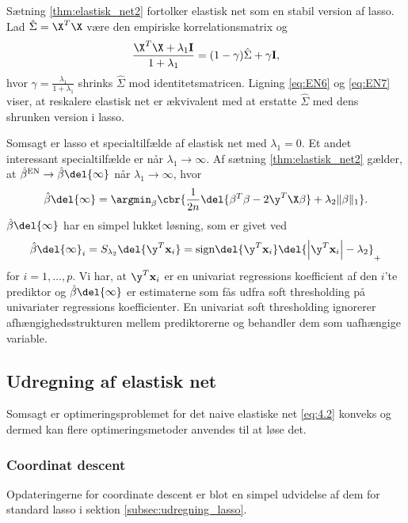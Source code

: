 %
Sætning \ref{thm:elastisk_net2} fortolker elastisk net som en stabil version af lasso.
Lad \(\hat{\Sigma} = \X^T \X\) være den empiriske korrelationsmatrix og
\begin{align*}
\frac{\X^T \X + \lambda_1 \mathbf{I}}{1 + \lambda_1} = (1-\gamma) \hat{\Sigma} + \gamma \mathbf{I},
\end{align*}
hvor \(\gamma=\frac{\lambda_1}{1+\lambda_1}\) shrinks \(\hat{\Sigma}\) mod identitetsmatricen.
Ligning \eqref{eq:EN6} og \eqref{eq:EN7} viser, at reskalere elastisk net er ækvivalent med at erstatte \(\hat{\Sigma}\) med dens shrunken version i lasso.


Somsagt er lasso et specialtilfælde af elastisk net med \(\lambda_1=0\). 
Et andet interessant specialtilfælde er når \(\lambda_1 \rightarrow \infty\).
Af sætning \ref{thm:elastisk_net2} gælder, at \(\hat{\beta}^\text{EN} \rightarrow \hat{\beta} \del{\infty}\) når \(\lambda_1 \rightarrow \infty\), hvor
\begin{align*}
\hat{\beta} \del{\infty} = \argmin_\beta \cbr{\frac{1}{2n} \del{\beta^T \beta - 2 \y^T \X \beta} + \lambda_2 \Vert \beta \Vert_1}.
\end{align*}
\(\hat{\beta} \del{\infty}\) har en simpel lukket løsning, som er givet ved
\begin{align*}
\hat{\beta} \del{\infty}_i = S_{\lambda_2} \del{\y^T \mathbf{x}_i}=\text{sign} \del{\y^T \mathbf{x}_i} \del{\left\vert \y^T \mathbf{x}_i \right\vert - \lambda_2}_+
\end{align*}
for \(i = 1, \ldots, p\).
Vi har, at \(\y^T \mathbf{x}_i\) er en univariat regressions koefficient af den \(i\)'te prediktor og \(\hat{\beta} \del{\infty}\) er estimaterne som fås udfra soft thresholding på univariater regressions koefficienter.
En univariat soft thresholding ignorerer afhængighedsstrukturen mellem prediktorerne og behandler dem som uafhængige variable.

\subsection{Udregning af elastisk net}
Somsagt er optimeringsproblemet for det naive elastiske net \eqref{eq:4.2} konveks og dermed kan flere optimeringsmetoder anvendes til at løse det.

\subsubsection{Coordinat descent}
Opdateringerne for coordinate descent er blot en simpel udvidelse af dem for standard lasso i sektion \ref{subsec:udregning_lasso}.

